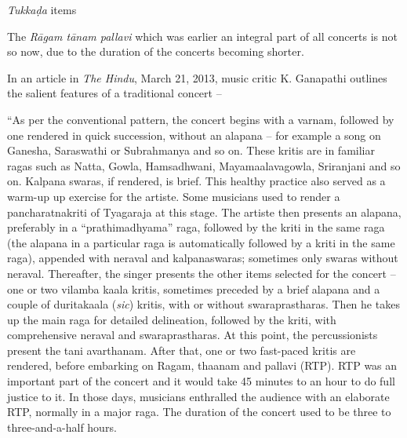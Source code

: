 \textit{Tukkaḍa} items

The \textit{Rāgam tānam pallavi} which was earlier an integral part of all concerts is not so now, due to the duration of the concerts becoming shorter.

In an article in \textit{The Hindu}, March 21, 2013, music critic K. Ganapathi outlines the salient features of a traditional concert –

\begin{myquote}
“As per the conventional pattern, the concert begins with a varnam, followed by one rendered in quick succession, without an alapana – for example a song on Ganesha, Saraswathi or Subrahmanya and so on. These kritis are in familiar ragas such as Natta, Gowla, Hamsadhwani, Mayamaalavagowla, Sriranjani and so on. Kalpana swaras, if rendered, is brief. This healthy practice also served as a warm-up up exercise for the artiste. Some musicians used to render a pancharatnakriti of Tyagaraja at this stage. The artiste then presents an alapana, preferably in a “prathimadhyama” raga, followed by the kriti in the same raga (the alapana in a particular raga is automatically followed by a kriti in the same raga), appended with neraval and kalpanaswaras; sometimes only swaras without neraval. Thereafter, the singer presents the other items selected for the concert – one or two vilamba kaala kritis, sometimes preceded by a brief alapana and a couple of duritakaala (\textit{sic}) kritis, with or without swaraprastharas. Then he takes up the main raga for detailed delineation, followed by the kriti, with comprehensive neraval and swaraprastharas. At this point, the percussionists present the tani avarthanam. After that, one or two fast-paced kritis are rendered, before embarking on Ragam, thaanam and pallavi (RTP). RTP was an important part of the concert and it would take 45 minutes to an hour to do full justice to it. In those days, musicians enthralled the audience with an elaborate RTP, normally in a major raga. The duration of the concert used to be three to three-and-a-half hours.
\end{myquote}


